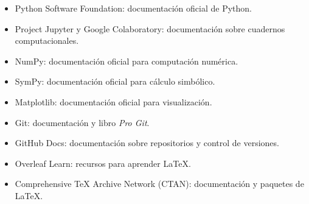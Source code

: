 \documentclass[12pt,letterpaper]{article}
\newcommand{\latexname}{\LaTeX}
\begin{document}
\begin{itemize}
    \item Python Software Foundation: documentación oficial de Python.
    \item Project Jupyter y Google Colaboratory: documentación sobre
    cuadernos computacionales.
    \item NumPy: documentación oficial para computación numérica.
    \item SymPy: documentación oficial para cálculo simbólico.
    \item Matplotlib: documentación oficial para visualización.
    \item Git: documentación y libro \textit{Pro Git}.
    \item GitHub Docs: documentación sobre repositorios y control de
    versiones.
    \item Overleaf Learn: recursos para aprender \latexname.
    \item Comprehensive TeX Archive Network (CTAN): documentación y
    paquetes de \latexname.
\end{itemize}

\end{document}
